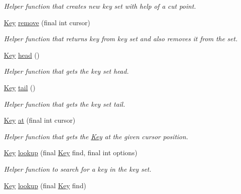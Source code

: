 \begin{DoxyCompactItemize}
\begin{DoxyCompactList}\small\item\em Helper function that creates new key set with help of a cut point. \end{DoxyCompactList}\item 
\hyperlink{classorg_1_1libelektra_1_1Key}{Key} \hyperlink{classorg_1_1libelektra_1_1KeySet_abd5cf0646744448c84a5bbcbf7a833b1}{remove} (final int cursor)
\begin{DoxyCompactList}\small\item\em Helper function that returns key from key set and also removes it from the set. \end{DoxyCompactList}\item 
\hyperlink{classorg_1_1libelektra_1_1Key}{Key} \hyperlink{classorg_1_1libelektra_1_1KeySet_a11ba1ef1213a9f1ac5743491bc7154e5}{head} ()
\begin{DoxyCompactList}\small\item\em Helper function that gets the key set head. \end{DoxyCompactList}\item 
\hyperlink{classorg_1_1libelektra_1_1Key}{Key} \hyperlink{classorg_1_1libelektra_1_1KeySet_ab81aff6c88595b3f4c3307d1f996857f}{tail} ()
\begin{DoxyCompactList}\small\item\em Helper function that gets the key set tail. \end{DoxyCompactList}\item 
\hyperlink{classorg_1_1libelektra_1_1Key}{Key} \hyperlink{classorg_1_1libelektra_1_1KeySet_a125d86734bd428c9eb1f937eb1b7ab74}{at} (final int cursor)
\begin{DoxyCompactList}\small\item\em Helper function that gets the \hyperlink{classorg_1_1libelektra_1_1Key}{Key} at the given cursor position. \end{DoxyCompactList}\item 
\hyperlink{classorg_1_1libelektra_1_1Key}{Key} \hyperlink{classorg_1_1libelektra_1_1KeySet_a6fb319a768b1cb43464154a93f9a2e93}{lookup} (final \hyperlink{classorg_1_1libelektra_1_1Key}{Key} find, final int options)
\begin{DoxyCompactList}\small\item\em Helper function to search for a key in the key set. \end{DoxyCompactList}\item 
\hyperlink{classorg_1_1libelektra_1_1Key}{Key} \hyperlink{classorg_1_1libelektra_1_1KeySet_a9ff1d475fd6ae316515c4c1cc173991b}{lookup} (final \hyperlink{classorg_1_1libelektra_1_1Key}{Key} find)

\end{DoxyCompactItemize}
